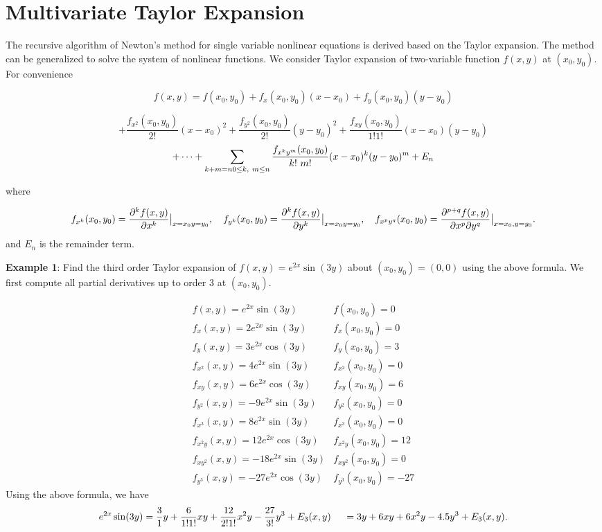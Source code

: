 \documentclass[
]{book}
\begin{document}
\hypertarget{multivariate-taylor-expansion}{%
\section{Multivariate Taylor Expansion}\label{multivariate-taylor-expansion}}

The recursive algorithm of Newton's method for single variable nonlinear
equations is derived based on the Taylor expansion. The method can be
generalized to solve the system of nonlinear functions. We consider Taylor
expansion of two-variable function \(f(x,y)\) at \((x_0, y_0)\). For
convenience

\[
f(x,y) = f(x_0, y_0) +  f_x(x_0,y_0)(x-x_0) + f_y(x_0,y_0)(y-y_0) 
\]

\[
 + \frac{f_{x^2}(x_0,y_0)}{2!}(x-x_0)^2 + \frac{f_{y^2}(x_0,y_0)}{2!}(y-y_0)^2 + \frac{f_{xy}(x_0,y_0)}{1!1!}(x-x_0)(y-y_0) 
\] \[
 + \cdots + \sum_{k+m = n\\0\le k,~m\le n}\frac{f_{x^ky^m}(x_0,y_0)}{k!~m!}(x-x_0)^k(y-y_0)^m + E_n
\]

where

\[
f_{x^k}(x_0,y_0) = \frac{\partial^{k} f(x,y)}{\partial x^k}\big{|}_{x=x_0\\y=y_0}, ~~~ f_{y^k}(x_0,y_0) = \frac{\partial^k f(x,y)}{\partial y^k}\big{|}_{x=x_0\\y=y_0}, ~~~ f_{x^py^q}(x_0,y_0) = \frac{\partial^{p+q} f(x,y)}{\partial x^p \partial y^q}\big{|}_{x=x_0,\\y=y_0}.
\] and \(E_n\) is the remainder term.

\textbf{Example 1}: Find the third order Taylor expansion of
\(f(x, y) = e^{2x}\sin(3y)\) about \((x_0, y_0) = (0, 0)\) using the above
formula. We first compute all partial derivatives up to order 3 at
\((x_0, y_0)\).

\[
\begin{array}{ll}
f(x, y) = e^{2x}\sin(3y)          &  f(x_0, y_0) = 0          \\
f_x(x, y) = 2e^{2x}\sin(3y)       &  f_x(x_0, y_0) = 0        \\
f_y(x, y) = 3e^{2x}\cos(3y)       &  f_y(x_0, y_0) = 3        \\
f_{x^2}(x, y) = 4e^{2x}\sin(3y)   &  f_{x^2}(x_0, y_0) = 0    \\
f_{xy}(x, y) = 6e^{2x}\cos(3y)    &  f_{xy}(x_0, y_0) = 6     \\
f_{y^2}(x, y) = -9e^{2x}\sin(3y)  &  f_{y^2}(x_0, y_0) = 0    \\
f_{x^3}(x, y) = 8e^{2x}\sin(3y)   &  f_{x^3}(x_0, y_0) = 0    \\
f_{x^2y}(x, y) = 12e^{2x}\cos(3y) &  f_{x^2y}(x_0, y_0) = 12  \\
f_{xy^2}(x, y) = -18e^{2x}\sin(3y)&  f_{xy^2}(x_0, y_0) = 0   \\
f_{y^3}(x,y) = -27e^{2x}\cos(3y)  &  f_{y^3}(x_0, y_0) = -27
\end{array}
\] Using the above formula, we have \[
 e^{2x}\sin(3y) = \frac{3}{1}y + \frac{6}{1!1!}xy + \frac{12}{2!1!}x^2y -\frac{27}{3!}y^3 + E_3(x,y) \\
 ~~~~=3y + 6xy + 6x^2y-4.5y^3 + E_3(x,y).
\]
\end{document}
